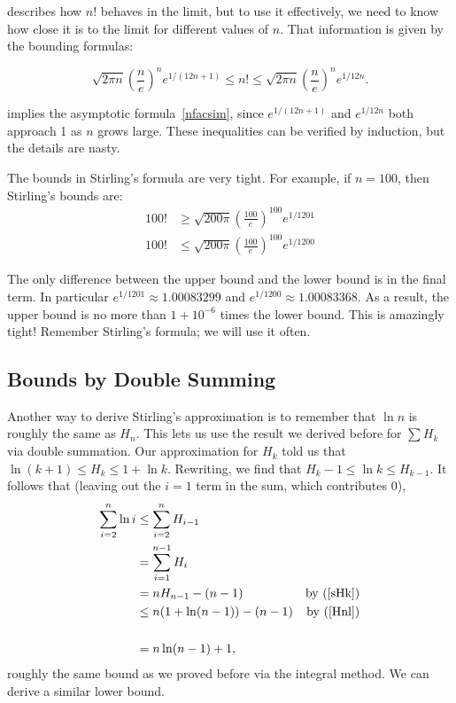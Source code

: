  describes how $n!$ behaves in the limit, but to
use it effectively, we need to know how close it is to the limit for
different values of $n$.  That information is given by the bounding
formulas:
\begin{fact*}
\[
\sqrt{2 \pi n} \left(\frac{n}{e}\right)^n e^{1/(12n+1)} \leq n! \leq
\sqrt{2 \pi n} \left(\frac{n}{e}\right)^n e^{1/12n}.
\]
\end{fact*}
 implies the asymptotic
formula~\eqref{nfacsim}, since $e^{1/(12n+1)}$ and $e^{1/12n}$ both
approach 1 as $n$ grows large.  These inequalities can be verified by
induction, but the details are nasty.

The bounds in Stirling's formula are very tight.  For example, if $n =
100$, then Stirling's bounds are:
\begin{align*}
100! & \geq  \sqrt{200 \pi} \left(\frac{100}{e}\right)^{100} e^{1/1201} \\
100! & \leq  \sqrt{200 \pi} \left(\frac{100}{e}\right)^{100} e^{1/1200}
\end{align*}

The only difference between the upper bound and the lower bound is in
the final term.  In particular $e^{1/1201} \approx 1.00083299$ and
$e^{1/1200} \approx 1.00083368$.  As a result, the upper bound is no
more than $1 + 10^{-6}$ times the lower bound.  This is amazingly
tight!  Remember Stirling's formula; we will use it often.

\begin{staffnotes}

\subsection*{Bounds by Double Summing}

Another way to derive Stirling's approximation is to remember that
$\ln n$ is roughly the same as $H_{n}$.  This lets us use the result
we derived before for $\sum H_k$ via double summation.  Our
approximation for $H_k$ told us that $\ln(k+1)\le H_k \le 1+\ln k$.
Rewriting, we find that $H_{k}-1 \le \ln k \le H_{k - 1}$.  It follows
that (leaving out the $i=1$ term in the sum, which contributes 0),
\begin{align*}
\sum_{i=2}^n \ln i &\le  \sum_{i=2}^n H_{i-1}\\
&= \sum_{i=1}^{n-1} H_i\\
&= nH_{n-1}-(n-1) & \text{by~(\ref{sHk})}\\
&\le n(1+\ln(n-1))-(n-1) & \text{by~(\ref{Hnl})}\\\\
&=n\ln(n-1)+1,
\end{align*}
roughly the same bound as we proved before via the integral method.
We can derive a similar lower bound.

\end{staffnotes}

